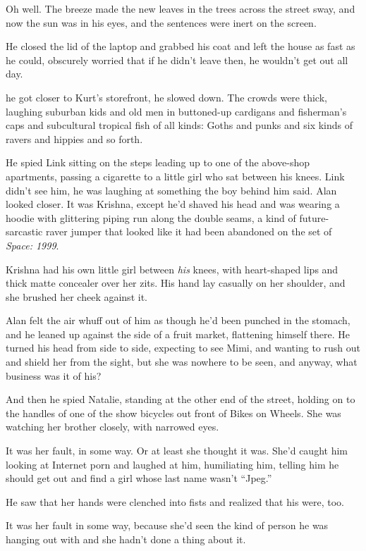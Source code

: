 Oh well.  The breeze made the new leaves in the trees across the
street sway, and now the sun was in his eyes, and the sentences were
inert on the screen.

He closed the lid of the laptop and grabbed his coat and left the
house as fast as he could, obscurely worried that if he didn't leave
then, he wouldn't get out all day.

 he got closer to Kurt's storefront, he slowed down.  The crowds
were thick, laughing suburban kids and old men in buttoned-up
cardigans and fisherman's caps and subcultural tropical fish of all
kinds:  Goths and punks and six kinds of ravers and hippies and so
forth.

He spied Link sitting on the steps leading up to one of the above-shop
apartments, passing a cigarette to a little girl who sat between his
knees.  Link didn't see him, he was laughing at something the boy
behind him said.  Alan looked closer.  It was Krishna, except he'd
shaved his head and was wearing a hoodie with glittering piping run
along the double seams, a kind of future-sarcastic raver jumper that
looked like it had been abandoned on the set of \textit{Space:  1999}.

Krishna had his own little girl between \textit{his} knees, with
heart-shaped lips and thick matte concealer over her zits.  His hand
lay casually on her shoulder, and she brushed her cheek against it.

Alan felt the air whuff out of him as though he'd been punched in the
stomach, and he leaned up against the side of a fruit market,
flattening himself there.  He turned his head from side to side,
expecting to see Mimi, and wanting to rush out and shield her from the
sight, but she was nowhere to be seen, and anyway, what business was
it of his?

And then he spied Natalie, standing at the other end of the street,
holding on to the handles of one of the show bicycles out front of
Bikes on Wheels.  She was watching her brother closely, with narrowed
eyes.

It was her fault, in some way.  Or at least she thought it was.  She'd
caught him looking at Internet porn and laughed at him, humiliating
him, telling him he should get out and find a girl whose last name
wasn't ``Jpeg.''

He saw that her hands were clenched into fists and realized that his
were, too.

It was her fault in some way, because she'd seen the kind of person he
was hanging out with and she hadn't done a thing about it.

